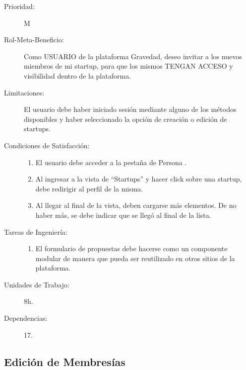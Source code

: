 \begin{description}
    \item[Prioridad:] M
    \item[Rol-Meta-Beneficio:] Como USUARIO de la plataforma Gravedad, deseo invitar a los nuevos miembros de mi startup, para que los mismos TENGAN ACCESO y visibilidad dentro de la plataforma.
    \item[Limitaciones:] El usuario debe haber iniciado sesión mediante alguno de los métodos disponibles y haber seleccionado la opción de creación o edición de startups.
    \item[Condiciones de Satisfacción:]  \hfill
        \begin{enumerate}
            \item El usuario debe acceder a la pestaña de Persona .
    		\item Al ingresar a la vista de “Startups” y hacer click sobre una startup, debe redirigir al perfil de la misma.
    		\item Al llegar al final de la vista, deben cargarse más elementos. De no haber más, se debe indicar que se llegó al final de la lista.
        \end{enumerate}
    \item[Tareas de Ingeniería:]  \hfill
        \begin{enumerate}
            \item El formulario de propuestas debe hacerse como un componente modular de manera que pueda ser reutilizado en otros sitios de la plataforma.
        \end{enumerate}
    \item[Unidades de Trabajo:] 8h.
    \item[Dependencias:] 17.
\end{description}

\newpage

\subsection{Edición de Membresías}

